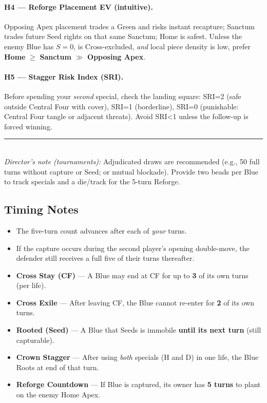 \documentclass[11pt]{article}
\begin{document}
\paragraph{H4 --- Reforge Placement EV (intuitive).}
Opposing Apex placement trades a Green and risks instant recapture; Sanctum trades future Seed rights on that same Sanctum; Home is safest. Unless the enemy Blue has $S=0$, is Cross-excluded, \emph{and} local piece density is low, prefer \textbf{Home} $\ge$ \textbf{Sanctum} $\gg$ \textbf{Opposing Apex}.

\paragraph{H5 --- Stagger Risk Index (SRI).}
Before spending your \emph{second} special, check the landing square:
SRI=2 (safe outside Central Four with cover), SRI=1 (borderline), SRI=0 (punishable: Central Four tangle or adjacent threats).
Avoid SRI<1 unless the follow-up is forced winning.

\bigskip

\noindent\rule{\linewidth}{0.4pt}\\
\small\emph{Director's note (tournaments):} Adjudicated draws are recommended (e.g., 50 full turns without capture or Seed; or mutual blockade). Provide two beads per Blue to track specials and a die/track for the 5-turn Reforge.

\subsection*{Timing Notes}
\begin{itemize}
  \item The five-turn count advances after each of \emph{your} turns.
  \item If the capture occurs during the second player's opening double-move, the defender still receives a full five of their turns thereafter.
\end{itemize}

\begin{tcolorbox}[enhanced,title={Five Timer s (Summary)},colback=white,colframe=royal,breakable]
\label{tbl:five-clocks}
\small
\begin{itemize}\itemsep0.2em
  \item \textbf{Cross Stay (CF)} --- A Blue may end at CF for up to \textbf{3} of its own turns (per life).
  \item \textbf{Cross Exile} --- After leaving CF, the Blue cannot re-enter for \textbf{2} of its own turns.
  \item \textbf{Rooted (Seed)} --- A Blue that Seeds is immobile \textbf{until its next turn} (still capturable).
  \item \textbf{Crown Stagger} --- After using \emph{both} specials (H and D) in one life, the Blue Roots at end of that turn.
  \item \textbf{Reforge Countdown} --- If Blue is captured, its owner has \textbf{5 turns} to plant on the enemy Home Apex.
\end{itemize}
\end{tcolorbox}
\end{document}
